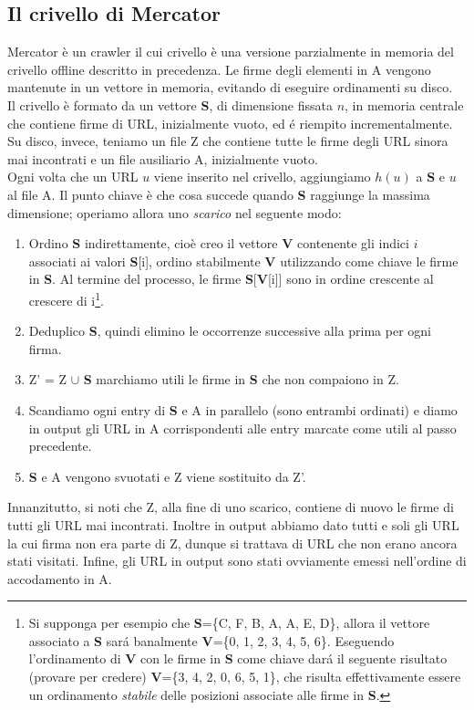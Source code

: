 \subsection{Il crivello di Mercator}
Mercator è un crawler \cite{Mercator} il cui crivello è una versione parzialmente in memoria del crivello offline descritto in precedenza. Le firme degli elementi in A vengono mantenute in un vettore in memoria, evitando di eseguire ordinamenti su disco.\\
Il crivello è formato da un vettore \textbf{S}, di dimensione fissata $n$, in memoria centrale che contiene firme di URL, inizialmente vuoto, ed é riempito incrementalmente. Su disco, invece, teniamo un file Z che contiene tutte le firme degli URL sinora mai incontrati e un file ausiliario A, inizialmente vuoto.\\
Ogni volta che un URL $u$ viene inserito nel crivello, aggiungiamo $h(u)$ a \textbf{S} e $u$ al file A. Il punto chiave è che cosa succede quando \textbf{S} raggiunge la massima dimensione; operiamo allora uno \textit{scarico} nel seguente modo:
\begin{enumerate}
    \item Ordino \textbf{S} indirettamente, cioè creo il vettore \textbf{V} contenente gli indici $i$ associati ai valori \textbf{S}[i], ordino stabilmente \textbf{V} utilizzando come chiave le firme in \textbf{S}. Al termine del processo, le firme \textbf{S}[\textbf{V}[i]] sono in ordine crescente al crescere di i\footnote{Si supponga per esempio che \textbf{S}=\{C, F, B, A, A, E, D\}, allora il vettore associato a \textbf{S} sará banalmente \textbf{V}=\{0, 1, 2, 3, 4, 5, 6\}. Eseguendo l'ordinamento di \textbf{V} con le firme in \textbf{S} come chiave dará il seguente risultato (provare per credere) \textbf{V}=\{3, 4, 2, 0, 6, 5, 1\}, che risulta effettivamente essere un ordinamento \textit{stabile} delle posizioni associate alle firme in \textbf{S}.}.
    \item Deduplico \textbf{S}, quindi elimino le occorrenze successive alla prima per ogni firma.
    \item Z' = Z $\cup$ \textbf{S} marchiamo utili le firme in \textbf{S} che non compaiono in Z.
    \item Scandiamo ogni entry di \textbf{S} e A in parallelo (sono entrambi ordinati) e diamo in output gli URL in A corrispondenti alle entry marcate come utili al passo precedente.
    \item \textbf{S} e A vengono svuotati e Z viene sostituito da Z'. 
\end{enumerate}
Innanzitutto, si noti che Z, alla fine di uno scarico, contiene di nuovo le firme di tutti gli URL mai incontrati. Inoltre in output abbiamo dato tutti e soli gli URL la cui firma non era parte di Z, dunque si trattava di URL che non erano ancora stati visitati. Infine, gli URL in output sono stati ovviamente emessi nell'ordine di accodamento in A.
